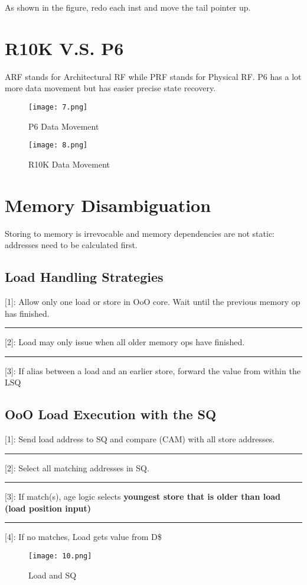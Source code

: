 \documentclass{article}
\begin{document}
\begin{multicols*}{2}
\noindent
As shown in the figure, redo each inst and move the tail pointer up.


\section{R10K V.S. P6}
ARF stands for Architectural RF while PRF stands for Physical RF. P6 has a lot more data movement but has easier precise state recovery.
\begin{figure}[H]
  \centering
    {\texttt{[image: 7.png]}}
  \caption{P6 Data Movement}
\end{figure}

\begin{figure}[H]
  \centering
    {\texttt{[image: 8.png]}}
  \caption{R10K Data Movement}
\end{figure}

\section{Memory Disambiguation}
Storing to memory is irrevocable and memory dependencies are not static: addresses need to be calculated first.

\subsection*{Load Handling Strategies}
{[1]}: Allow only one load or store in OoO core. Wait until the previous memory op has finished.
\medskip\hrule\medskip\noindent
{[2]}: Load may only issue when all older memory ops have finished.
\medskip\hrule\medskip\noindent
{[3]}: If alias between a load and an earlier store, forward the value from within the LSQ

\subsection*{OoO Load Execution with the SQ}
{[1]}: Send load address to SQ and compare (CAM) with all store addresses.
\medskip\hrule\medskip\noindent
{[2]}: Select all matching addresses in SQ.
\medskip\hrule\medskip\noindent
{[3]}: If match(s), age logic selects \textbf{youngest store that is older than load (load position input)}
\medskip\hrule\medskip\noindent
{[4]}: If no matches, Load gets value from D\$
\begin{figure}[H]
  \centering
    {\texttt{[image: 10.png]}}
  \caption{Load and SQ}
\end{figure}


\end{multicols*}
\end{document}
